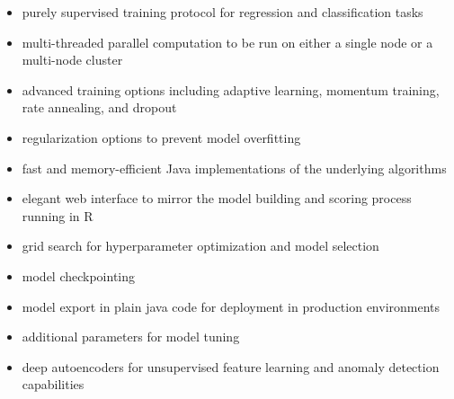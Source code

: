 \documentclass[12pt]{article}
\begin{document}
\begin{itemize}

\item purely supervised training protocol for regression and classification tasks

\item multi-threaded parallel computation to be run on either a single node or a multi-node cluster

\item advanced training options including adaptive learning, momentum training, rate annealing, and dropout

\item regularization options to prevent model overfitting

\item fast and memory-efficient Java implementations of the underlying algorithms

\item elegant web interface to mirror the model building and scoring process running in R

\item grid search for hyperparameter optimization and model selection

\item model checkpointing

\item model export in plain java code for deployment in production environments

\item additional parameters for model tuning

\item deep autoencoders for unsupervised feature learning and anomaly detection capabilities

\end{itemize}
\end{document}

